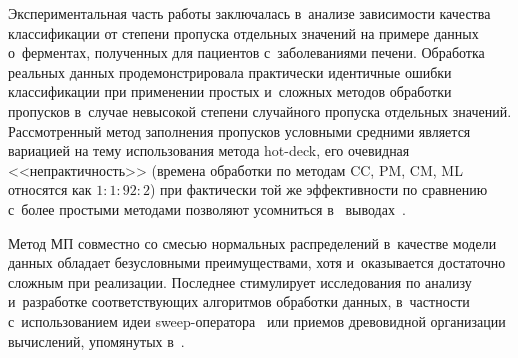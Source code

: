 \begin{multicols}{2}
     Экспериментальная часть работы заключалась в~анализе зависимости 
качества классификации от степени пропуска отдельных значений на примере 
данных о~ферментах, полученных для пациентов с~заболеваниями печени. 
Обработка реальных данных продемонстрировала практически идентичные 
ошибки классификации при применении простых и~сложных методов 
обработки пропусков в~случае невысокой степени случайного пропуска 
отдельных значений. Рассмотренный метод заполнения пропусков условными 
средними является вариацией на тему использования метода hot-deck, его 
очевидная <<непрактичность>> (времена обработки по методам CC, PM, CM, 
ML относятся как $1:1:92:2$) при фактически той же эффективности по 
сравнению с~более простыми методами позволяют усомниться в~
выводах~\cite{8-kri}. 
     
     Метод МП совместно со смесью нормальных 
распределений в~качестве модели данных обладает безусловными 
преимуществами, хотя и~оказывается достаточно сложным при реализации. 
Последнее стимулирует исследования по анализу и~разработке 
соответствующих алгоритмов обработки данных, в~частности 
с~использованием идеи sweep-опе\-ра\-то\-ра~\cite{3-kri} или 
приемов древовидной организации вычислений, упомянутых в~\cite{16-kri}.
     

\end{multicols}
